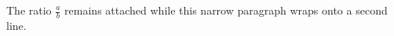 \documentclass{article}
\begin{document}
\noindent The ratio $\frac{a}{b}$ remains attached while this narrow paragraph wraps onto a second line.
\end{document}

